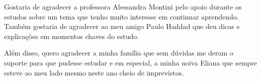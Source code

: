 \begin{agradecimentos}
Gostaria de agradecer a professora Alessandra Montini pelo apoio durante os estudos sobre um tema que tenho muito interesse em continuar aprendendo. Também gostaria de agradecer ao meu amigo Paulo Haddad que deu dicas e explicações em momentos chaves do estudo.

Além disso, quero agradecer a minha família que sem dúvidas me deram o suporte para que pudesse estudar e em especial, a minha noiva Eliana que sempre esteve ao meu lado mesmo neste ano cheio de imprevistos.

\end{agradecimentos}
